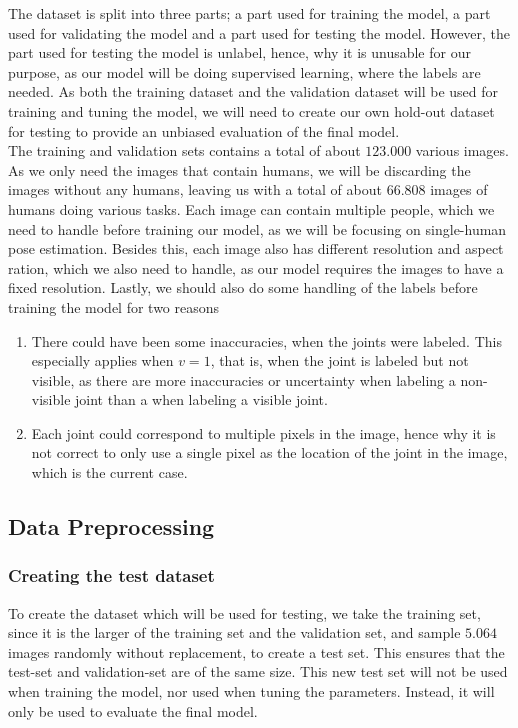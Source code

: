 \documentclass[main.tex]{subfiles}
\begin{document}
The dataset is split into three parts; a part used for training the model, a part used for validating the model and a part used for testing the model. However, the part used for testing the model is unlabel, hence, why it is unusable for our purpose, as our model will be doing supervised learning, where the labels are needed. As both the training dataset and the validation dataset will be used for training and tuning the model, we will need to create our own hold-out dataset for testing to provide an unbiased evaluation of the final model. \\
The training and validation sets contains a total of about $123.000$ various images. As we only need the images that contain humans, we will be discarding the images without any humans, leaving us with a total of about $66.808$ images of humans doing various tasks. Each image can contain multiple people, which we need to handle before training our model, as we will be focusing on single-human pose estimation. Besides this, each image also has different resolution and aspect ration, which we also need to handle, as our model requires the images to have a fixed resolution. Lastly, we should also do some handling of the labels before training the model for two reasons
\begin{enumerate}
    \item There could have been some inaccuracies, when the joints were labeled. This especially applies when $v = 1$, that is, when the joint is labeled but not visible, as there are more inaccuracies or uncertainty when labeling a non-visible joint than a when labeling a visible joint.
    \item Each joint could correspond to multiple pixels in the image, hence why it is not correct to only use a single pixel as the location of the joint in the image, which is the current case.
\end{enumerate}

\subsection{Data Preprocessing}
\subsubsection{Creating the test dataset}
To create the dataset which will be used for testing, we take the training set, since it is the larger of the training set and the validation set, and sample $5.064$ images randomly without replacement, to create a test set. This ensures that the test-set and validation-set are of the same size. This new test set will not be used when training the model, nor used when tuning the parameters. Instead, it will only be used to evaluate the final model. 
\end{document}
